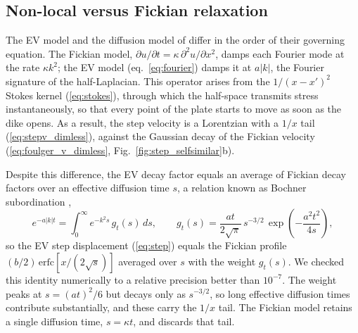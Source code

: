 \documentclass[extra]{gji}
\begin{document}
\subsection{Non-local versus Fickian relaxation}
\label{sec:disc_nonlocal}

The EV model and the diffusion model of \citet{foulger1992post} differ in
the order of their governing equation.  The
Fickian model, $\partial u/\partial t = \kappa\,\partial^2 u/\partial x^2$,
damps each Fourier mode at the rate $\kappa k^2$; the EV model
(eq.~\ref{eq:fourier}) damps it at $a|k|$, the Fourier signature of the
half-Laplacian.  This operator arises from the $1/(x-x')^2$ Stokes kernel
(\ref{eq:stokes}), through which the half-space transmits stress
instantaneously, so that every point of the plate starts to move as soon
as the dike opens.  As a result, the step velocity is a
Lorentzian with a $1/x$ tail (\ref{eq:stepv_dimless}), against the Gaussian
decay of the Fickian velocity (\ref{eq:foulger_v_dimless},
Fig.~\ref{fig:step_selfsimilar}b).

Despite this difference, the EV decay factor equals an average of Fickian
decay factors over an effective diffusion time $s$, a relation known as
Bochner subordination \citep{metzler2000random},
\begin{equation}
e^{-a|k|t} = \int_0^{\infty} e^{-k^2 s}\, g_t(s)\,ds, \qquad
g_t(s) = \frac{at}{2\sqrt{\pi}}\, s^{-3/2}\,
  \exp\!\left(-\frac{a^2t^2}{4s}\right),
\label{eq:subordination}
\end{equation}
so the EV step displacement (\ref{eq:step}) equals the Fickian profile
$(b/2)\,\mathrm{erfc}[x/(2\sqrt{s})]$ averaged over $s$ with the weight
$g_t(s)$.  We checked this identity numerically to a relative precision
better than $10^{-7}$.  The weight peaks at $s = (at)^2/6$ but decays only as
$s^{-3/2}$, so long effective diffusion times contribute substantially, and
these carry the $1/x$ tail.  The Fickian model retains a single diffusion
time, $s = \kappa t$, and discards that tail.
\end{document}
